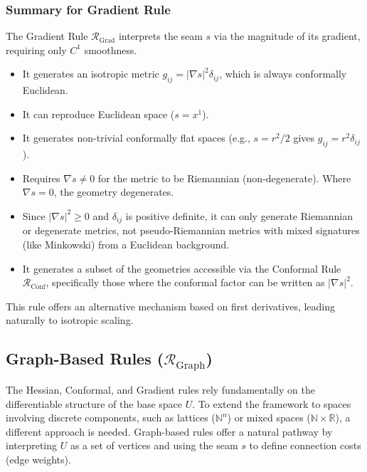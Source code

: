 \documentclass[twoside,twocolumn]{article}
\numberwithin{equation}{section} %
\begin{document}
\subsubsection{Summary for Gradient Rule}
The Gradient Rule \( \mathcal{R}_{\text{Grad}} \) interprets the seam \( s \) via the magnitude of its gradient, requiring only \( C^1 \) smoothness.
\begin{itemize}
    \item It generates an isotropic metric \( g_{ij} = |\nabla s|^2 \delta_{ij} \), which is always conformally Euclidean.
    \item It can reproduce Euclidean space ($s=x^1$).
    \item It generates non-trivial conformally flat spaces (e.g., $s=r^2/2$ gives $g_{ij}=r^2 \delta_{ij}$).
    \item Requires $\nabla s \neq 0$ for the metric to be Riemannian (non-degenerate). Where $\nabla s = 0$, the geometry degenerates.
    \item Since $|\nabla s|^2 \ge 0$ and $\delta_{ij}$ is positive definite, it can only generate Riemannian or degenerate metrics, not pseudo-Riemannian metrics with mixed signatures (like Minkowski) from a Euclidean background.
    \item It generates a subset of the geometries accessible via the Conformal Rule $\mathcal{R}_{\text{Conf}}$, specifically those where the conformal factor can be written as $|\nabla s|^2$.
\end{itemize}
This rule offers an alternative mechanism based on first derivatives, leading naturally to isotropic scaling.


\subsection{Graph-Based Rules ($\mathcal{R}_{\text{Graph}}$)}
\setcounter{definition}{0}

The Hessian, Conformal, and Gradient rules rely fundamentally on the differentiable structure of the base space $U$. To extend the framework to spaces involving discrete components, such as lattices ($\mathbb{N}^n$) or mixed spaces ($\mathbb{N} \times \mathbb{R}$), a different approach is needed. Graph-based rules offer a natural pathway by interpreting $U$ as a set of vertices and using the seam $s$ to define connection costs (edge weights).
\end{document}

